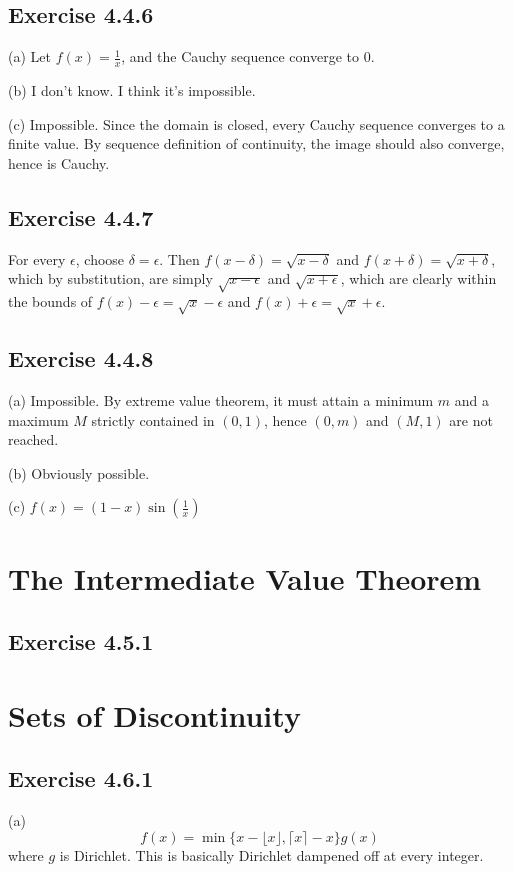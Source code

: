 \documentclass{book}
\begin{document}
\subsection*{Exercise 4.4.6}
(a)
Let $f(x) = \frac{1}{x}$, and the Cauchy sequence converge to $0$.

\noindent
(b)
I don't know. I think it's impossible.

\noindent
(c)
Impossible. Since the domain is closed, every Cauchy sequence converges to a finite value. By sequence definition of continuity, the image should also converge, hence is Cauchy.

\subsection*{Exercise 4.4.7}
For every $\epsilon$, choose $\delta = \epsilon$. Then $f(x - \delta) = \sqrt{x - \delta}$ and $f(x + \delta) = \sqrt{x + \delta}$, which by substitution, are simply $\sqrt{x - \epsilon}$ and $\sqrt{x + \epsilon}$, which are clearly within the bounds of $f(x) - \epsilon = \sqrt{x} - \epsilon$ and $f(x) + \epsilon = \sqrt{x} + \epsilon$.

\subsection*{Exercise 4.4.8}
(a)
Impossible. By extreme value theorem, it must attain a minimum $m$ and a maximum $M$ strictly contained in $(0, 1)$, hence $(0, m)$ and $(M, 1)$ are not reached.

\noindent
(b)
Obviously possible.

\noindent
(c)
$f(x) = (1 - x) \sin \left( \frac{1}{x} \right)$

\section{The Intermediate Value Theorem}

\subsection*{Exercise 4.5.1}

\section{Sets of Discontinuity}

\subsection*{Exercise 4.6.1}
(a)
$$f(x) = \min \{ x - \lfloor x \rfloor, \lceil x \rceil - x \} g(x)$$
where $g$ is Dirichlet. This is basically Dirichlet dampened off at every integer.
\end{document}
